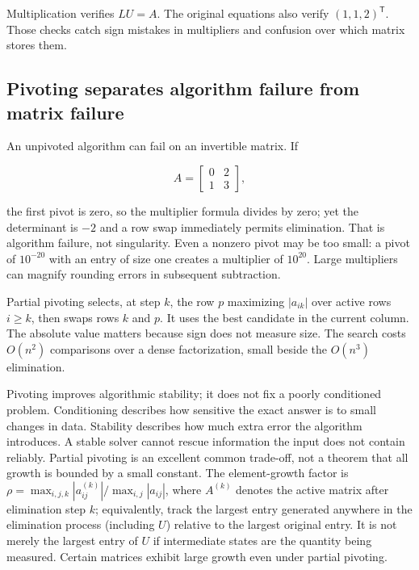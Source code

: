Multiplication verifies \(LU=A\). The original equations also verify \((1,1,2)^\mathsf T\). Those checks catch sign mistakes in multipliers and confusion over which matrix stores them.

\subsection{Pivoting separates algorithm failure from matrix failure}\label{01-foundations-i-ch019-pivoting-separates-algorithm-failure-from-matrix-failure}

An unpivoted algorithm can fail on an invertible matrix. If

\[
A=\begin{bmatrix}0&2\\1&3\end{bmatrix},
\]

the first pivot is zero, so the multiplier formula divides by zero; yet the determinant is \(-2\) and a row swap immediately permits elimination. That is algorithm failure, not singularity. Even a nonzero pivot may be too small: a pivot of \(10^{-20}\) with an entry of size one creates a multiplier of \(10^{20}\). Large multipliers can magnify rounding errors in subsequent subtraction.

Partial pivoting selects, at step \(k\), the row \(p\) maximizing \(|a_{ik}|\) over active rows \(i\ge k\), then swaps rows \(k\) and \(p\). It uses the best candidate in the current column. The absolute value matters because sign does not measure size. The search costs \(O(n^2)\) comparisons over a dense factorization, small beside the \(O(n^3)\) elimination.

Pivoting improves algorithmic stability; it does not fix a poorly conditioned problem. Conditioning describes how sensitive the exact answer is to small changes in data. Stability describes how much extra error the algorithm introduces. A stable solver cannot rescue information the input does not contain reliably. Partial pivoting is an excellent common trade-off, not a theorem that all growth is bounded by a small constant. The element-growth factor is \(\rho=\max_{i,j,k}|a_{ij}^{(k)}|/\max_{i,j}|a_{ij}|\), where \(A^{(k)}\) denotes the active matrix after elimination step \(k\); equivalently, track the largest entry generated anywhere in the elimination process (including \(U\)) relative to the largest original entry. It is not merely the largest entry of \(U\) if intermediate states are the quantity being measured. Certain matrices exhibit large growth even under partial pivoting.

